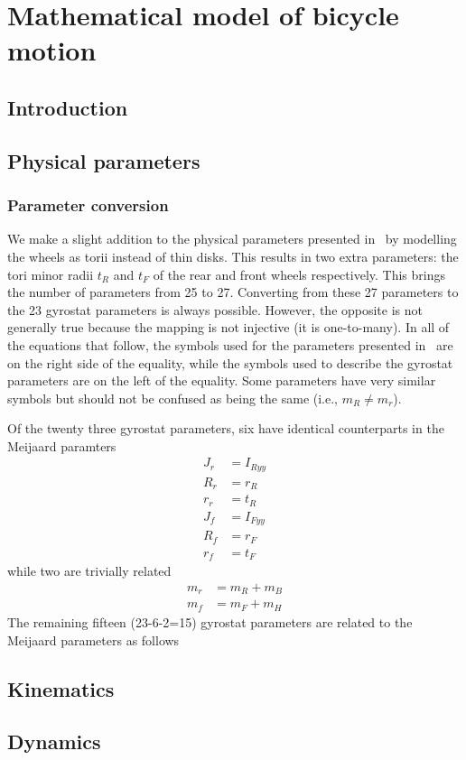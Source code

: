 \chapter{Mathematical model of bicycle motion} \label{chapter2}

\section{Introduction}

\section{Physical parameters}

\subsection{Parameter conversion}\label{model:parameter_conversion}
We make a slight addition to the physical parameters presented
in~\cite{Meijaard2007} by modelling the wheels as torii instead of thin disks.
This results in two extra parameters: the tori minor radii $t_R$ and $t_F$ of
the rear and front wheels respectively. This brings the number of parameters
from 25 to 27. Converting from these 27 parameters to the 23 gyrostat
parameters is always possible. However, the opposite is not generally true
because the mapping is not injective (it is one-to-many). In all of the
equations that follow, the symbols used for the parameters presented
in~\cite{Meijaard2007} are on the right side of the equality, while the symbols
used to describe the gyrostat parameters are on the left of the equality. Some
parameters have very similar symbols but should not be confused as being the
same (i.e., $m_R \ne m_r$).

Of the twenty three gyrostat parameters, six have identical counterparts in the Meijaard
paramters
\begin{align}
  J_r &= I_{Ryy} \\
  R_r &= r_R \\
  r_r &= t_R\\
  J_f &= I_{Fyy} \\
  R_f &= r_F \\
  r_f &= t_F
\end{align}
while two are trivially related
\begin{align}
    m_r &= m_R + m_B \\
    m_f &= m_F + m_H
\end{align}
The remaining fifteen (23-6-2=15) gyrostat parameters are related to the
Meijaard parameters as follows






\section{Kinematics}

\section{Dynamics}


